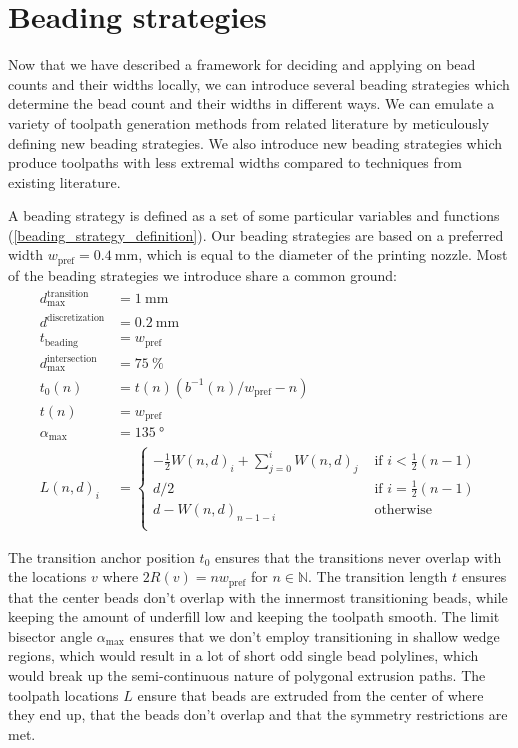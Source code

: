 \section{Beading strategies}
Now that we have described a framework for deciding and applying on bead counts and their widths locally, we can introduce several beading strategies which determine the bead count and their widths in different ways.
We can emulate a variety of toolpath generation methods from related literature by meticulously defining new beading strategies.
We also introduce new beading strategies which produce toolpaths with less extremal widths compared to techniques from existing literature.

A beading strategy is defined as a set of some particular variables and functions (\cref{beading_strategy_definition}).
Our beading strategies are based on a preferred width $w_\text{pref} = \SI{0.4}{\milli\meter}$, which is equal to the diameter of the printing nozzle.
Most of the beading strategies we introduce share a common ground:
\begin{align*}
d_\text{max}^\text{transition} &= \SI{1}{\milli\meter} \\
d^\text{discretization} &= \SI{0.2}{\milli\meter} \\
t_\text{beading} &= w_\text{pref} \\
d_\text{max}^\text{intersection} &= \SI{75}{\percent} \\
%
t_0(n) &=  t(n) \left( b^{-1}(n) / w_\text{pref}  - n \right) \\
t(n) &= w_\text{pref} \\
\alpha_\text{max} &= \SI{135}{\degree} \\
L(n,d)_i &= 
\begin{cases}
-\frac12 W(n,d)_i + \sum_{j=0}^i W(n,d)_j & \text{ if } i < \frac12 (n -1) \\
d/2 & \text{ if } i =  \frac12 (n -1) \\
d - W(n,d)_{n-1-i} & \text{ otherwise }\\
\end{cases}
\end{align*}

The transition anchor position $t_0$ ensures that the transitions never overlap with the locations $v$ where $2 R(v) = n w_\text{pref}$ for $n \in \mathbb{N}$.
The transition length $t$ ensures that the center beads don't overlap with the innermost transitioning beads, while keeping the amount of underfill low and keeping the toolpath smooth.
The limit bisector angle $\alpha_\text{max}$ ensures that we don't employ transitioning in shallow wedge regions, which would result in a lot of short odd single bead polylines, which would break up the semi-continuous nature of polygonal extrusion paths.
The toolpath locations $L$ ensure that beads are extruded from the center of where they end up, that the beads don't overlap and that the symmetry restrictions are met.


